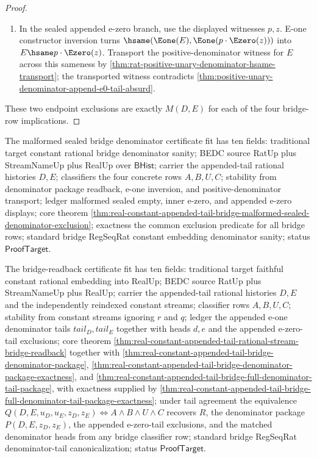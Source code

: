 \begin{proof}
\begin{enumerate}
  \item In the sealed appended e-zero branch, use the displayed witnesses
  $p,z$. E-one constructor inversion turns
  $\hsame(\Eone(E),\Eone(p\cdot\Ezero(z)))$ into
  $E\hsame p\cdot\Ezero(z)$. Transport the positive-denominator witness for
  $E$ across this sameness by
  \autoref{thm:rat-positive-unary-denominator-hsame-transport}; the
  transported witness contradicts
  \autoref{thm:positive-unary-denominator-append-e0-tail-absurd}.
\end{enumerate}

These two endpoint exclusions are exactly $M(D,E)$ for each of the four
bridge-row implications.
\end{proof}

The malformed sealed bridge denominator certificate fit has ten fields:
traditional target constant rational bridge denominator sanity; BEDC source
RatUp plus StreamNameUp plus RealUp over $\mathsf{BHist}$; carrier the
appended-tail rational histories $D,E$; classifiers the four concrete rows
$A,B,U,C$; stability from denominator package readback, e-one inversion, and
positive-denominator transport; ledger malformed sealed empty, inner e-zero,
and appended e-zero displays; core theorem
\autoref{thm:real-constant-appended-tail-bridge-malformed-sealed-denominator-exclusion};
exactness the common exclusion predicate for all bridge rows; standard bridge
RegSeqRat constant embedding denominator sanity; status $\mathsf{ProofTarget}$.

The bridge-readback certificate fit has ten fields: traditional target faithful
constant rational embedding into RealUp; BEDC source RatUp plus StreamNameUp
plus RealUp; carrier the appended-tail rational histories $D,E$ and the
independently reindexed constant streams; classifier rows $A,B,U,C$; stability
from constant streams ignoring $r$ and $q$; ledger the appended e-one
denominator tails $tail_D,tail_E$ together with heads $d,e$ and the appended
e-zero-tail exclusions; core theorem
\autoref{thm:real-constant-appended-tail-rational-stream-bridge-readback}
together with
\autoref{thm:real-constant-appended-tail-bridge-denominator-package},
\autoref{thm:real-constant-appended-tail-bridge-denominator-package-exactness},
and
\autoref{thm:real-constant-appended-tail-bridge-full-denominator-tail-package},
with exactness supplied by
\autoref{thm:real-constant-appended-tail-bridge-full-denominator-tail-package-exactness};
under tail agreement the equivalence
$Q(D,E,u_D,u_E,z_D,z_E)\Longleftrightarrow A\land B\land U\land C$ recovers
$R$, the denominator package $P(D,E,z_D,z_E)$, the appended e-zero-tail
exclusions, and the matched denominator heads from any bridge classifier row;
standard bridge RegSeqRat denominator-tail canonicalization; status
$\mathsf{ProofTarget}$.
